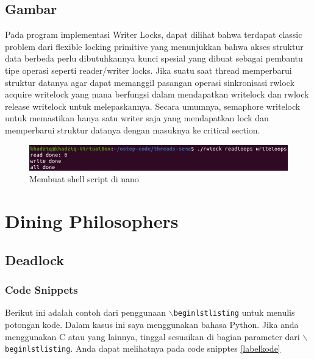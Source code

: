 \documentclass[11pt,a4paper]{article}
\begin{document}
\subsection{Gambar}
    Pada program implementasi Writer Locks, dapat dilihat bahwa terdapat classic problem dari flexible
    locking primitive yang menunjukkan bahwa akses struktur data berbeda perlu dibutuhkannya kunci spesial
    yang dibuat sebagai pembantu tipe operasi seperti reader/writer locks. Jika suatu saat thread memperbarui
    struktur datanya agar dapat memanggil pasangan operasi sinkronisasi rwlock acquire writelock yang mana
    berfungsi dalam mendapatkan writelock dan rwlock release writelock untuk melepaskannya. Secara umumnya,
    semaphore writelock untuk memastikan hanya satu writer saja yang mendapatkan lock dan memperbarui
    struktur datanya dengan masuknya ke critical section.
    
    \begin{figure}[h]
        \centering
        \includegraphics[scale = 0.6]{Figure/rwlock.png}
        \caption{Membuat shell script di nano}
        \label{fig:asg6_1}
    \end{figure}
\section{Dining Philosophers}
\subsection{Deadlock}
\subsubsection{Code Snippets}
    Berikut ini adalah contoh dari penggunaan $\backslash${\tt{begin{lstlisting}}} untuk menulis potongan kode. Dalam kasus ini saya menggunakan bahasa Python. Jika anda menggunakan C atau yang lainnya, tinggal sesuaikan di bagian parameter dari $\backslash${\tt{begin{lstlisting}}}. Anda dapat melihatnya pada code snipptes \ref{labelkode}
    
\end{document}
